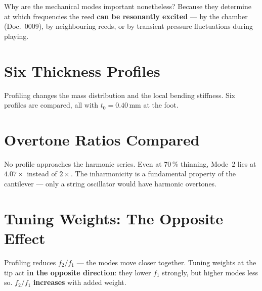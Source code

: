 \documentclass[11pt,a4paper]{article}
\begin{document}
Why are the mechanical modes important nonetheless? Because they determine
at which frequencies the reed \textbf{can be resonantly excited} ---
by the chamber (Doc.~0009), by neighbouring reeds, or by transient
pressure fluctuations during playing.

\section{Six Thickness Profiles}

Profiling changes the mass distribution and the local bending stiffness.
Six profiles are compared, all with $t_0 = 0{.}40$\,mm at the foot.

\begin{center}
\end{center}

\section{Overtone Ratios Compared}

No profile approaches the harmonic series. Even at 70\,\% thinning,
Mode~2 lies at $4{.}07\times$ instead of $2\times$. The inharmonicity
is a fundamental property of the cantilever --- only a string oscillator
would have harmonic overtones.

\section{Tuning Weights: The Opposite Effect}

Profiling reduces $f_2/f_1$ --- the modes move closer together.
Tuning weights at the tip act \textbf{in the opposite direction}: they lower $f_1$
strongly, but higher modes less so. $f_2/f_1$ \textbf{increases} with added weight.
\end{document}
